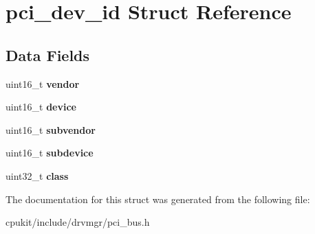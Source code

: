 \hypertarget{structpci__dev__id}{}\section{pci\+\_\+dev\+\_\+id Struct Reference}
\label{structpci__dev__id}
\subsection*{Data Fields}
\begin{DoxyCompactItemize}
\item 
\mbox{\label{structpci__dev__id_a0250c9d10fbe082d394a2711eff84e20}} 
uint16\+\_\+t {\bfseries vendor}
\item 
\mbox{\label{structpci__dev__id_a786ac080e80124e849dd5b2f9b22af4d}} 
uint16\+\_\+t {\bfseries device}
\item 
\mbox{\label{structpci__dev__id_a534876772b2feffaabcb953782a48607}} 
uint16\+\_\+t {\bfseries subvendor}
\item 
\mbox{\label{structpci__dev__id_ac73d5bb53e3eff719f963ae79996f110}} 
uint16\+\_\+t {\bfseries subdevice}
\item 
\mbox{\label{structpci__dev__id_ab981a866ce7c6ae376950b35f5178511}} 
uint32\+\_\+t {\bfseries class}
\end{DoxyCompactItemize}


The documentation for this struct was generated from the following file\+:\begin{DoxyCompactItemize}
\item 
cpukit/include/drvmgr/pci\+\_\+bus.\+h\end{DoxyCompactItemize}
